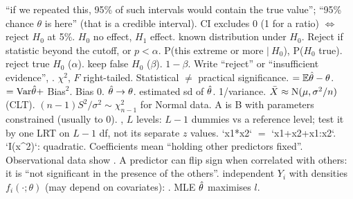 \sk{} “if we repeated this, 95\% of such intervals would contain the true value”;  “95\% chance $\theta$ is here” (that is a credible interval). CI excludes 0 (1 for a ratio) $\iff$ reject $H_0$ at 5\%.
\bx
{} $H_0$ no effect, $H_1$ effect.  known distribution under $H_0$. Reject if statistic beyond the cutoff, or $p<\alpha$.  P(this extreme or more $|\ H_0$),  P($H_0$ true).  reject true $H_0$ ($\alpha$).  keep false $H_0$ ($\beta$).  $1-\beta$. Write “reject” or “insufficient evidence”, . $\chi^2$, $F$ right-tailed. Statistical $\ne$ practical significance.
\bx
{}  $=\mathbb{E}\hat{\theta}-\theta$.  $=\mathrm{Var}\hat{\theta}+$ Bias$^2$.  Bias 0.  $\hat{\theta}\to\theta$.  estimated sd of $\hat{\theta}$.  1/variance. $\bar X\approx\mathrm{N}(\mu,\sigma^2/n)$ (CLT). $(n-1)S^2/\sigma^2\sim\chi^2_{n-1}$ for Normal data.
\bx
{}  A is B with parameters constrained (usually to 0). , $L$ levels: $L-1$ dummies vs a reference level; test it by one LRT on $L-1$ df, not its separate $z$ values. `x1*x2` $=$ `x1+x2+x1:x2`. `I(x^2)`: quadratic. Coefficients mean “holding other predictors fixed”. Observational data show . A predictor can flip sign when correlated with others: it is “not significant in the presence of the others”.
 independent $Y_i$ with densities $f_i(\cdot;\theta)$ (may depend on covariates): . MLE $\hat{\theta}$ maximises $l$.
